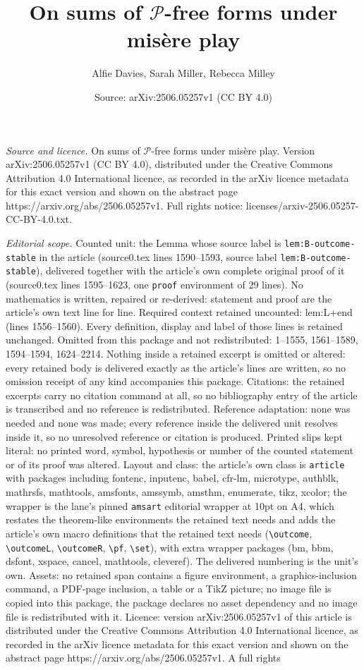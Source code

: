 \documentclass[10pt,a4paper]{amsart}
\title[On sums of $\mathscr{P}$-free forms under mis\`ere play]{On sums of $\mathscr{P}$-free forms under mis\`ere play}
\author{Alfie Davies, Sarah Miller, Rebecca Milley}
\date{Source: arXiv:2506.05257v1 (CC BY 4.0)}
\begin{document}
\maketitle

\noindent\emph{Source and licence.} On sums of $\mathscr{P}$-free forms under mis\`ere play. Version arXiv:2506.05257v1 (CC BY 4.0), distributed under the Creative Commons Attribution 4.0 International licence, as recorded in the arXiv licence metadata for this exact version and shown on the abstract page https://arxiv.org/abs/2506.05257v1. Full rights notice: licenses/arxiv-2506.05257-CC-BY-4.0.txt.\par\smallskip

\noindent\textit{Editorial scope.} Counted unit: the Lemma whose source label is \texttt{lem:B-outcome-stable} in the article (source0.tex lines 1590--1593, source label \texttt{lem:B-outcome-stable}), delivered together with the article's own complete original proof of it (source0.tex lines 1595--1623, one \texttt{proof} environment of 29 lines). No mathematics is written, repaired or re-derived: statement and proof are the article's own text line for line. Required context retained uncounted: lem:L+end (lines 1556--1560). Every definition, display and label of those lines is retained unchanged. Omitted from this package and not redistributed: 1--1555, 1561--1589, 1594--1594, 1624--2214. Nothing inside a retained excerpt is omitted or altered: every retained body is delivered exactly as the article's lines are written, so no omission receipt of any kind accompanies this package. Citations: the retained excerpts carry no citation command at all, so no bibliography entry of the article is transcribed and no reference is redistributed. Reference adaptation: none was needed and none was made; every reference inside the delivered unit resolves inside it, so no unresolved reference or citation is produced. Printed slips kept literal: no printed word, symbol, hypothesis or number of the counted statement or of its proof was altered. Layout and class: the article's own class is \texttt{article} with packages including fontenc, inputenc, babel, cfr-lm, microtype, authblk, mathrsfs, mathtools, amsfonts, amssymb, amsthm, enumerate, tikz, xcolor; the wrapper is the lane's pinned \texttt{amsart} editorial wrapper at 10pt on A4, which restates the theorem-like environments the retained text needs and adds the article's own macro definitions that the retained text needs (\texttt{\textbackslash outcome}, \texttt{\textbackslash outcomeL}, \texttt{\textbackslash outcomeR}, \texttt{\textbackslash pf}, \texttt{\textbackslash set}), with extra wrapper packages (bm, bbm, dsfont, xspace, cancel, mathtools, cleveref). The delivered numbering is the unit's own. Assets: no retained span contains a figure environment, a graphics-inclusion command, a PDF-page inclusion, a table or a TikZ picture; no image file is copied into this package, the package declares no asset dependency and no image file is redistributed with it. Licence: version arXiv:2506.05257v1 of this article is distributed under the Creative Commons Attribution 4.0 International licence, as recorded in the arXiv licence metadata for this exact version and shown on the abstract page https://arxiv.org/abs/2506.05257v1. A full rights 
\end{document}
